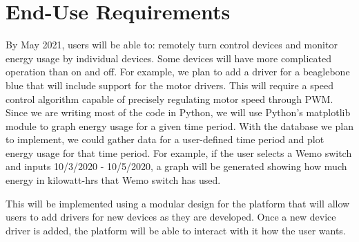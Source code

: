 \documentclass[12pt]{article} %
\begin{document}
\section{End-Use Requirements}
By May 2021, users will be able to: remotely turn control devices and monitor energy usage by individual devices.
\medbreak\noindent
Some devices will have more complicated operation than on and off. For example, we plan to add a driver for a beaglebone blue that will include support for the motor drivers. This will require a speed control algorithm capable of precisely regulating motor speed through PWM.
\medbreak\noindent
Since we are writing most of the code in Python, we will use Python's matplotlib module to graph energy usage for a given time period. With the database we plan to implement, we could gather data for a user-defined time period and plot energy usage for that time period. For example, if the user selects a Wemo switch and inputs 10/3/2020 - 10/5/2020, a graph will be generated showing how much energy in kilowatt-hrs that Wemo switch has used.

This will be implemented using a modular design for the platform that will allow users to add drivers for new devices as they are developed. Once a new device driver is added, the platform will be able to interact with it how the user wants.
\end{document}
